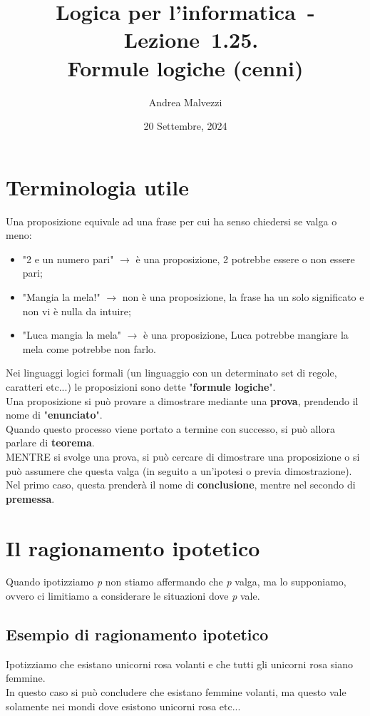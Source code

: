 \documentclass[12pt]{article}
\author{Andrea Malvezzi}
\title{\textbf{Logica per l'informatica~-~Lezione~1.25.\\Formule logiche (cenni)}}
\date{20 Settembre, 2024}
\begin{document}
\maketitle
\pagebreak
\section{Terminologia utile}
Una proposizione equivale ad una frase per cui ha senso chiedersi se valga o meno:
\begin{itemize}
    \item "2 e un numero pari" $\rightarrow$ è una proposizione, 2 potrebbe essere o non essere pari;
    \item "Mangia la mela!" $\rightarrow$ non è una proposizione, la frase ha un solo significato e non vi è nulla da intuire;
    \item "Luca mangia la mela" $\rightarrow$ è una proposizione, Luca potrebbe mangiare la mela come potrebbe non farlo.
\end{itemize}
Nei linguaggi logici formali (un linguaggio con un determinato set di regole, caratteri etc...) le proposizioni sono dette "\textbf{formule logiche}".\\
Una proposizione si può provare a dimostrare mediante una \textbf{prova}, prendendo il nome di "\textbf{enunciato}".\\
Quando questo processo viene portato a termine con successo, si può allora parlare di \textbf{teorema}.\\
MENTRE si svolge una prova, si può cercare di dimostrare una proposizione o si può assumere che questa valga (in seguito a un'ipotesi o previa dimostrazione).\\
Nel primo caso, questa prenderà il nome di \textbf{conclusione}, mentre nel secondo di \textbf{premessa}.
\section{Il ragionamento ipotetico}
Quando ipotizziamo \textit{p} non stiamo affermando che \textit{p} valga, ma lo supponiamo, ovvero ci limitiamo a considerare le situazioni dove \textit{p} vale.
\subsection*{Esempio di ragionamento ipotetico}
Ipotizziamo che esistano unicorni rosa volanti e che tutti gli unicorni rosa siano femmine.\\
In questo caso si può concludere che esistano femmine volanti, ma questo vale solamente nei mondi dove esistono unicorni rosa etc... 
\end{document}
